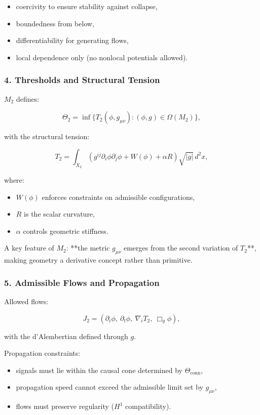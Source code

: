 \begin{itemize}
    \item coercivity to ensure stability against collapse,
    \item boundedness from below,
    \item differentiability for generating flows,
    \item local dependence only (no nonlocal potentials allowed).
\end{itemize}

\subsubsection*{4. Thresholds and Structural Tension}

$M_2$ defines:

\[
\Theta_2 = \inf \{ T_2(\phi, g_{\mu\nu}) : (\phi, g) \in \Omega(M_2) \},
\]

with the structural tension:

\[
T_2 = \int_{X_2}
\left(
g^{ij} \partial_i \phi \partial_j \phi
+ W(\phi)
+ \alpha R
\right)
\sqrt{|g|}\, d^2x,
\]

where:

\begin{itemize}
    \item $W(\phi)$ enforces constraints on admissible configurations,
    \item $R$ is the scalar curvature,
    \item $\alpha$ controls geometric stiffness.
\end{itemize}

A key feature of $M_2$:
**the metric $g_{\mu\nu}$ emerges from the second variation of $T_2$**,
making geometry a derivative concept rather than primitive.

\subsubsection*{5. Admissible Flows and Propagation}

Allowed flows:

\[
J_2 = (\partial_i \phi,\ \partial_t \phi,\ \nabla_i T_2,\ \Box_g \phi),
\]

with the d'Alembertian defined through $g$.

Propagation constraints:

\begin{itemize}
    \item signals must lie within the causal cone determined by $\Theta_{\text{conn}}$,
    \item propagation speed cannot exceed the admissible limit set by $g_{\mu\nu}$,
    \item flows must preserve regularity ($H^1$ compatibility).
\end{itemize}

